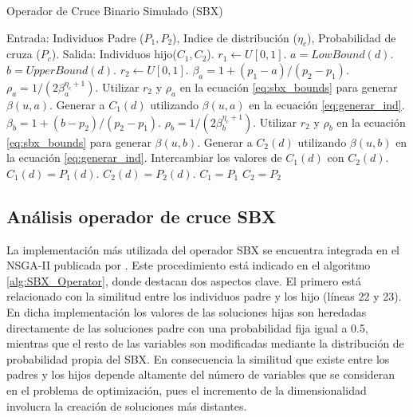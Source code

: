  \begin{algorithm}[H]
\scriptsize
\caption{Operador de Cruce Binario Simulado (SBX)}
\label{alg:SBX_Operator}
\begin{algorithmic}[1]
    \STATE Entrada: Individuos Padre ($P_1, P_2$), Indice de distribución ($\eta_c$), Probabilidad de cruza ($P_c$).
    \STATE Salida: Individuos hijo($C_1, C_2$).
    \STATE $r_1 \leftarrow U[0, 1]$.
		 \STATE $a = LowBound(d)$.	
		 \STATE $b = UpperBound(d)$.    
		 \STATE $ r_2 \leftarrow U[0, 1]$.
		 \STATE $\beta_a = 1 +(p_1 - a)/(p_2 - p_1)$.
		 \STATE $\rho_a = 1/(2 \beta_a^{\eta_c+1})$.
		 \STATE Utilizar $r_2$ y $\rho_a$ en la ecuación \ref{eq:sbx_bounds} para generar $\beta(u,a)$.  
		 \STATE Generar a $C_1(d)$ utilizando $\beta(u, a)$ en la ecuación \ref{eq:generar_ind}. 
		 \STATE $\beta_b = 1 +(b - p_2)/(p_2 - p_1)$.
		 \STATE $\rho_b = 1/(2 \beta_b^{\eta_c+1})$.
		 \STATE Utilizar $r_2$ y $\rho_b$ en la ecuación \ref{eq:sbx_bounds} para generar $\beta(u,b)$. 
		 \STATE Generar a $C_2(d)$ utilizando $\beta(u, b)$ en la ecuación \ref{eq:generar_ind}.
		  
			 \STATE Intercambiar los valores de $C_1(d)$ con $C_2(d)$. 
		 \ENDIF {}
        \ELSE {}
	   \STATE $C_1(d) = P_1(d)$. 
	   \STATE $C_2(d) = P_2(d)$.
        \ENDIF {}
       \ENDFOR
    \ELSE
	\STATE $C_1 = P_1$
	\STATE $C_2 = P_2$
    \ENDIF
\end{algorithmic}
\end{algorithm}


%
\subsection{Análisis operador de cruce SBX}

%
La implementación más utilizada del operador SBX se encuentra integrada en el NSGA-II publicada por \cite{Joel:NSGAII}.
%
Este procedimiento está indicado en el algoritmo \ref{alg:SBX_Operator}, donde destacan dos aspectos clave.
%
El primero está relacionado con la similitud entre los individuos padre y los hijo (líneas 22 y 23).
%
En dicha implementación los valores de las soluciones hijas son heredadas directamente de las soluciones padre con una probabilidad fija igual a 0.5, mientras que el resto de las variables son modificadas mediante la distribución de probabilidad propia del SBX.
%
En consecuencia la similitud que existe entre los padres y los hijos depende altamente del número de variables que se consideran en el problema de optimización, pues el incremento de la dimensionalidad involucra la creación de soluciones más distantes.

